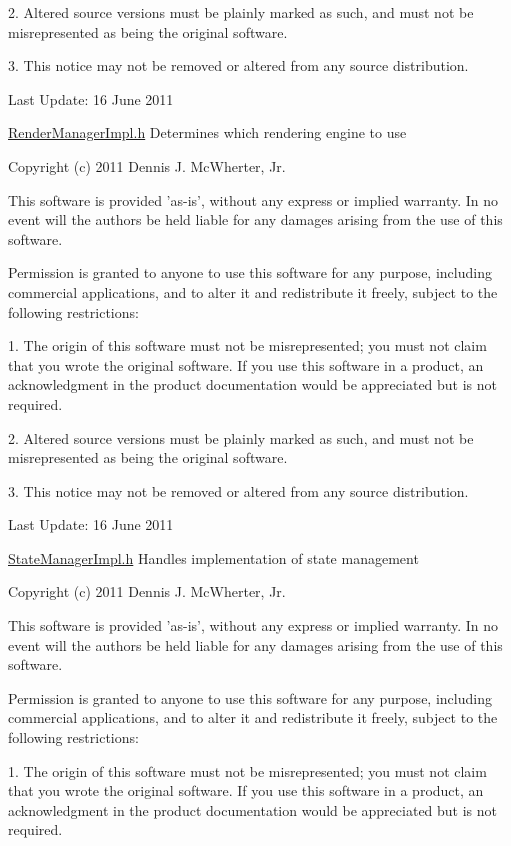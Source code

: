 2. Altered source versions must be plainly marked as such, and must not be misrepresented as being the original software.

3. This notice may not be removed or altered from any source distribution.

Last Update: 16 June 2011

\hyperlink{_render_manager_impl_8h_source}{RenderManagerImpl.h} Determines which rendering engine to use

Copyright (c) 2011 Dennis J. McWherter, Jr.

This software is provided 'as-\/is', without any express or implied warranty. In no event will the authors be held liable for any damages arising from the use of this software.

Permission is granted to anyone to use this software for any purpose, including commercial applications, and to alter it and redistribute it freely, subject to the following restrictions:

1. The origin of this software must not be misrepresented; you must not claim that you wrote the original software. If you use this software in a product, an acknowledgment in the product documentation would be appreciated but is not required.

2. Altered source versions must be plainly marked as such, and must not be misrepresented as being the original software.

3. This notice may not be removed or altered from any source distribution.

Last Update: 16 June 2011

\hyperlink{_state_manager_impl_8h_source}{StateManagerImpl.h} Handles implementation of state management

Copyright (c) 2011 Dennis J. McWherter, Jr.

This software is provided 'as-\/is', without any express or implied warranty. In no event will the authors be held liable for any damages arising from the use of this software.

Permission is granted to anyone to use this software for any purpose, including commercial applications, and to alter it and redistribute it freely, subject to the following restrictions:

1. The origin of this software must not be misrepresented; you must not claim that you wrote the original software. If you use this software in a product, an acknowledgment in the product documentation would be appreciated but is not required.

